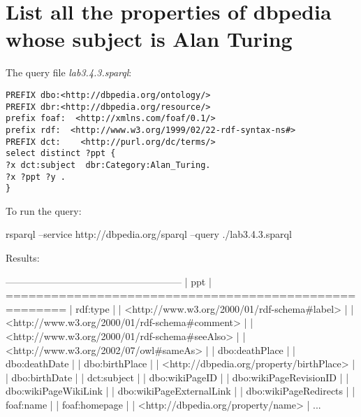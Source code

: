 \documentclass[a4paper, 12pt]{report}
\begin{document}
\section{List all the properties of dbpedia whose subject is Alan Turing}
The query file \emph{lab3.4.3.sparql}:
\begin{lstlisting}[frame=single]
PREFIX dbo:<http://dbpedia.org/ontology/>
PREFIX dbr:<http://dbpedia.org/resource/>
prefix foaf:  <http://xmlns.com/foaf/0.1/>
prefix rdf:  <http://www.w3.org/1999/02/22-rdf-syntax-ns#>
PREFIX dct:    <http://purl.org/dc/terms/>
select distinct ?ppt {
?x dct:subject  dbr:Category:Alan_Turing.
?x ?ppt ?y .
}
\end{lstlisting}
To run the query:
\begin{commandshell}
    rsparql --service http://dbpedia.org/sparql --query ./lab3.4.3.sparql
\end{commandshell}
Results:
\begin{messageshell}
------------------------------------------------------
| ppt                                                |
======================================================
| rdf:type                                           |
| <http://www.w3.org/2000/01/rdf-schema#label>       |
| <http://www.w3.org/2000/01/rdf-schema#comment>     |
| <http://www.w3.org/2000/01/rdf-schema#seeAlso>     |
| <http://www.w3.org/2002/07/owl#sameAs>             |
| dbo:deathPlace                                     |
| dbo:deathDate                                      |
| dbo:birthPlace                                     |
| <http://dbpedia.org/property/birthPlace>           |
| dbo:birthDate                                      |
| dct:subject                                        |
| dbo:wikiPageID                                     |
| dbo:wikiPageRevisionID                             |
| dbo:wikiPageWikiLink                               |
| dbo:wikiPageExternalLink                           |
| dbo:wikiPageRedirects                              |
| foaf:name                                          |
| foaf:homepage                                      |
| <http://dbpedia.org/property/name>                 |
...
\end{messageshell}
\end{document}
